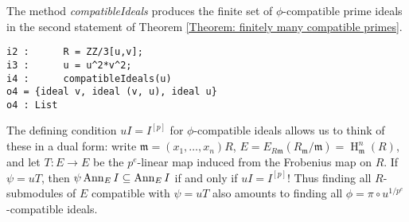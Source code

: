 \documentclass[11pt]{amsart}
\DeclareMathOperator{\HH}{H}
\begin{document}
The method \emph{compatibleIdeals} produces the finite set of $\phi$-compatible prime ideals in the second statement of Theorem \ref{Theorem: finitely many compatible primes}.

\begin{verbatim}
i2 :      R = ZZ/3[u,v];
i3 :      u = u^2*v^2;
i4 :      compatibleIdeals(u)
o4 = {ideal v, ideal (v, u), ideal u}
o4 : List
\end{verbatim}

The defining condition $u I = I^{[p]}$ for $\phi$-compatible ideals allows us to
think of these in a dual form: write $\mathfrak{m}=(x_1, \dots, x_n)R$,
$E=E_{R\mathfrak{m}}(R_{\mathfrak{m}}/\mathfrak{m})=\HH^n_{\mathfrak{m}} (R)$, and let $T: E \rightarrow E$ be the $p^e$-linear map
induced from the Frobenius map on $R$.
If $\psi=u T$, then $\psi \operatorname{{Ann}}_E I \subseteq \operatorname{{Ann}}_E I$ if and only if $u I = I^{[p]}$!
Thus finding all $R$-submodules of $E$ compatible with $\psi=u T$ also amounts to finding all
$\phi=\pi \circ u^{1/p^e}$-compatible ideals.
\end{document}
